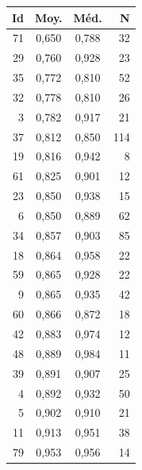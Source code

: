 \documentclass[12pt,a4paper]{report}
\begin{document}
\begin{minipage}[t]{0.48\textwidth}
\centering
\begin{tabular}{rccr}
\toprule
\textbf{Id} & \textbf{Moy.} & \textbf{Méd.} & \textbf{N} \\
\midrule
71 & 0,650 & 0,788 & 32 \\
29 & 0,760 & 0,928 & 23 \\
35 & 0,772 & 0,810 & 52 \\
32 & 0,778 & 0,810 & 26 \\
3 & 0,782 & 0,917 & 21 \\
37 & 0,812 & 0,850 & 114 \\
19 & 0,816 & 0,942 & 8 \\
61 & 0,825 & 0,901 & 12 \\
23 & 0,850 & 0,938 & 15 \\
6 & 0,850 & 0,889 & 62 \\
34 & 0,857 & 0,903 & 85 \\
18 & 0,864 & 0,958 & 22 \\
59 & 0,865 & 0,928 & 22 \\
9 & 0,865 & 0,935 & 42 \\
60 & 0,866 & 0,872 & 18 \\
42 & 0,883 & 0,974 & 12 \\
48 & 0,889 & 0,984 & 11 \\
39 & 0,891 & 0,907 & 25 \\
4 & 0,892 & 0,932 & 50 \\
5 & 0,902 & 0,910 & 21 \\
11 & 0,913 & 0,951 & 38 \\
79 & 0,953 & 0,956 & 14 \\
\bottomrule
\end{tabular}
\end{minipage}
\end{document}
